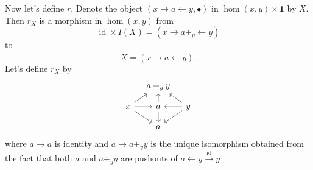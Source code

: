 \documentclass[12pt]{article}
\renewcommand{\(}{\left(}
\renewcommand{\)}{\right)}
\renewcommand{\{}{\left\lbrace}
\renewcommand{\}}{\right\rbrace}
\renewcommand{\tilde}{\widetilde}
\DeclareMathOperator{\id}{id}
\theoremstyle{remark}
\theoremstyle{definition}
\begin{document}
Now let's define $r$. Denote the object $\left( x \rightarrow a \leftarrow y , \bullet \right)$ in $\hom (x,y) \times \mathbf{1}$ by $X$.  Then $r_X$ is a morphism in $\hom (x,y)$ from 
\[
	\id \times I (X) 
		= (x \to a +_y \leftarrow y)
\]
to
\[
	\tilde{X} = (x \to a \leftarrow y).
\]
Let's define $r_X$ by
\[
		\begin{tikzcd}[column sep=1em,row sep=1em]
			{} &
			{a +_y y} &
			{} \\
			{x}
				\ar[ru] 
				\ar[r]
				\ar[rd] &
			{a} 
				\ar[u]
				\ar[d]&
			{y}
				\ar[lu]
				\ar[l]
				\ar[ld]\\
			{} &
			{a} &
			{} 
		\end{tikzcd}
\]
where $a \to a$ is identity and $a \to a+_yy$ is the unique isomorphism obtained from the fact that both $a$ and $a+_yy$ are pushouts of $a \leftarrow y \xrightarrow{\id} y$
\end{document}
